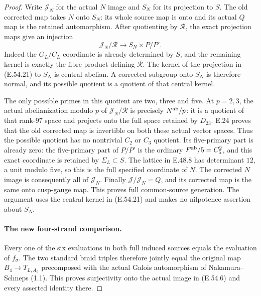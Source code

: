 \begin{proof}
Write $\mathcal J_N$ for the actual $N$ image and $S_N$
for its projection to $S$.  The old corrected map takes
$N$ onto $S_N$: its whole source map is onto and its
actual $Q$ map is the retained automorphism.
After quotienting by $\mathcal R$, the exact projection
maps give an injection
\[
       \mathcal J_N/\mathcal R
                     \longrightarrow S_N\times P/P'.
 \tag{E.54.21}
\]
Indeed the $G_L/C_L$ coordinate is already determined
by $S$, and the remaining kernel is exactly the fibre
product defining $\mathcal R$.
The kernel of the projection in \textup{(E.54.21)} to
$S_N$ is central abelian.  A corrected subgroup onto
$S_N$ is therefore normal, and its possible quotient
is a quotient of that central kernel.

The only possible primes in this quotient are two, three
and five.  At $p=2,3$, the actual abelianization modulo
$p$ of $\mathcal J_N/\mathcal R$ is precisely
$N^{\rm ab}/p$: it is a quotient of that rank-$97$
space and projects onto the full space retained by
$D_{23}$.  E.24 proves that the old corrected map is
invertible on both these actual vector spaces.  Thus
the possible quotient has no nontrivial $C_2$ or $C_3$
quotient.  Its five-primary part is already zero:
the five-primary part of $P/P'$ is the ordinary
$F^{\rm ab}/5=C_5^2$, and this exact coordinate is
retained by $\Sigma_L\subset S$.  The lattice in
E.48.8 has determinant $12$, a unit modulo five,
so this is the full specified coordinate of $N$.
The corrected $N$ image is consequently all of
$\mathcal J_N$.  Finally $\mathcal J/\mathcal J_N=Q$,
and its corrected map is the same onto cusp-gauge
map.  This proves full common-source generation.
The argument uses the central kernel in
\textup{(E.54.21)} and makes no nilpotence assertion
about $S_N$.

\paragraph{The new four-strand comparison.}
Every one of the six evaluations in both full induced
sources equals the evaluation of $f_\sigma$.  The two
standard braid triples therefore jointly equal the
original map $B_4\to T_{L,A_6}$ precomposed with the
actual Galois automorphism of Nakamura--Schneps (1.1).
This proves surjectivity onto the actual image in
\textup{(E.54.6)} and every asserted identity there.
\end{proof}
